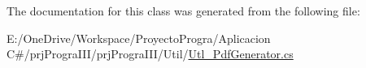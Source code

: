 The documentation for this class was generated from the following file\+:\begin{DoxyCompactItemize}
\item 
E\+:/\+One\+Drive/\+Workspace/\+Proyecto\+Progra/\+Aplicacion C\#/prj\+Progra\+I\+I\+I/prj\+Progra\+I\+I\+I/\+Util/\hyperlink{_utl___pdf_generator_8cs}{Utl\+\_\+\+Pdf\+Generator.\+cs}\end{DoxyCompactItemize}
